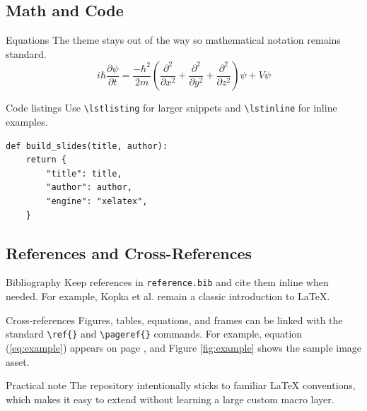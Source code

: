 \documentclass[8pt]{beamer}
\begin{document}
\subsection{Math and Code}

\begin{frame}[fragile]{\insertsection}{\insertsubsection}
    \label{frame:math-and-code}

    \begin{block}{Equations}
        The theme stays out of the way so mathematical notation remains standard.
        \begin{equation}
            \label{eq:example}
            i\hbar\frac{\partial \psi}{\partial t}
            = \frac{-\hbar^2}{2m} \left(
            \frac{\partial^2}{\partial x^2}
            + \frac{\partial^2}{\partial y^2}
            + \frac{\partial^2}{\partial z^2}
            \right) \psi + V\psi
        \end{equation}
    \end{block}

    \begin{block}{Code listings}
        Use \lstinline|\lstlisting| for larger snippets and \lstinline|\lstinline| for inline examples.
        \begin{lstlisting}[style=python]
def build_slides(title, author):
    return {
        "title": title,
        "author": author,
        "engine": "xelatex",
    }
        \end{lstlisting}
    \end{block}

\end{frame}

\subsection{References and Cross-References}

\begin{frame}[fragile]{\insertsection}{\insertsubsection}

    \begin{block}{Bibliography}
        Keep references in \lstinline|reference.bib| and cite them inline when needed. For example, Kopka et al. remain a classic introduction to \LaTeX{}.
    \end{block}

    \begin{block}{Cross-references}
        Figures, tables, equations, and frames can be linked with the standard \lstinline|\ref{}| and \lstinline|\pageref{}| commands. For example, equation (\ref{eq:example}) appears on page \pageref{frame:math-and-code}, and Figure \ref{fig:example} shows the sample image asset.
    \end{block}

    \begin{callout}{Practical note}
        The repository intentionally sticks to familiar \LaTeX{} conventions, which makes it easy to extend without learning a large custom macro layer.
    \end{callout}

\end{frame}
\end{document}
